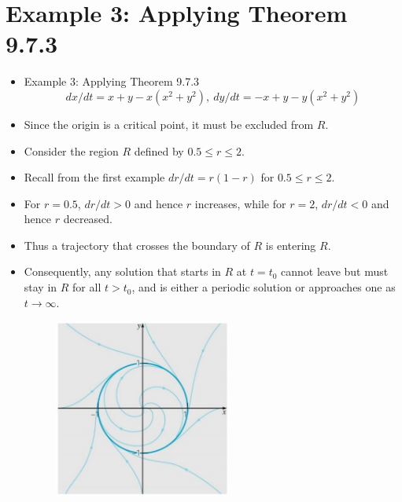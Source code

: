\documentclass[11pt,a4paper]{article}
\begin{document}
	\section*{Example 3: Applying Theorem 9.7.3}
	\begin{itemize}
		\item Example 3: Applying Theorem 9.7.3
		$$
		dx/dt = x+y-x(x^2+y^2),\ dy/dt = -x+y-y(x^2+y^2)
		$$
		\item Since the origin is a critical point, it must be excluded from $R$.
		\item Consider the region $R$ defined by $0.5 \leq r \leq 2$.
		\item Recall from the first example $dr/dt = r(1-r)$ for $0.5 \leq r \leq 2$.
		\item For $r = 0.5$, $dr/dt > 0$ and hence $r$ increases, while for $r = 2$, $dr/dt < 0$ and hence $r$ decreased.
		\item Thus a trajectory that crosses the boundary of $R$ is entering $R$.
		\item Consequently, any solution that starts in $R$ at $t = t_0$ cannot leave but must stay in $R$ for all $t > t_0$, and is either a periodic solution or approaches one as $t \to \infty$.
		\begin{figure}[H]
			\centering
			\includegraphics[width=0.55\textwidth]{figure/Lec19f5.PNG}
		\end{figure}
	\end{itemize}
\end{document}
